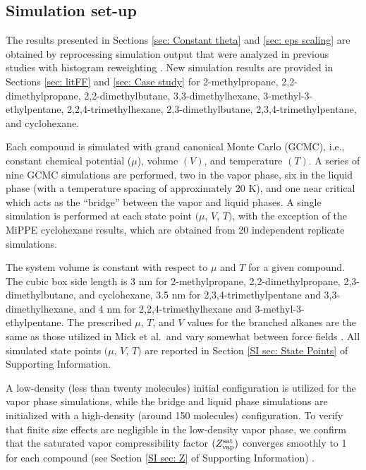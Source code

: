\documentclass[journal=jced,manuscript=article]{achemso}
\begin{document}
\subsection{Simulation set-up} \label{sec: Simulation set-up}

The results presented in Sections \ref{sec: Constant theta} and \ref{sec: eps scaling} are obtained by reprocessing simulation output that were analyzed in previous studies with histogram reweighting \cite{Potoff_branched,Barhaghi2017}. New simulation results are provided in Sections \ref{sec: litFF} and \ref{sec: Case study} for 2-methylpropane, 2,2-dimethylpropane, 2,2-dimethylbutane, 3,3-dimethylhexane, 3-methyl-3-ethylpentane, 2,2,4-trimethylhexane, 2,3-dimethylbutane, 2,3,4-trimethylpentane, and cyclohexane. 

Each compound is simulated with grand canonical Monte Carlo (GCMC), i.e., constant chemical potential ($\mu$), volume $(V)$, and temperature $(T)$. A series of nine GCMC simulations are performed, two in the vapor phase, six in the liquid phase (with a temperature spacing of approximately 20 K), and one near critical which acts as the ``bridge'' between the vapor and liquid phases. A single simulation is performed at each state point $(\mu$, $V$, $T)$, with the exception of the MiPPE cyclohexane results, which are obtained from 20 independent replicate simulations. 

The system volume is constant with respect to $\mu$ and $T$ for a given compound. The cubic box side length is 3 nm for 2-methylpropane, 2,2-dimethylpropane, 2,3-dimethylbutane, and cyclohexane, 3.5 nm for 2,3,4-trimethylpentane and 3,3-dimethylhexane, and 4 nm for 2,2,4-trimethylhexane and 3-methyl-3-ethylpentane. The prescribed $\mu$, $T$, and $V$ values for the branched alkanes are the same as those utilized in Mick et al.~and vary somewhat between force fields \cite{Potoff_branched}. All simulated state points $(\mu$, $V$, $T)$ are reported in Section \ref{SI sec: State Points} of Supporting Information. 

A low-density (less than twenty molecules) initial configuration is utilized for the vapor phase simulations, while the bridge and liquid phase simulations are initialized with a high-density (around 150 molecules) configuration. To verify that finite size effects are negligible in the low-density vapor phase, we confirm that the saturated vapor compressibility factor $(Z^{\rm sat}_{\rm vap})$ converges smoothly to 1 for each compound (see Section \ref{SI sec: Z} of Supporting Information) \cite{Nezbeda2016}.
\end{document}
